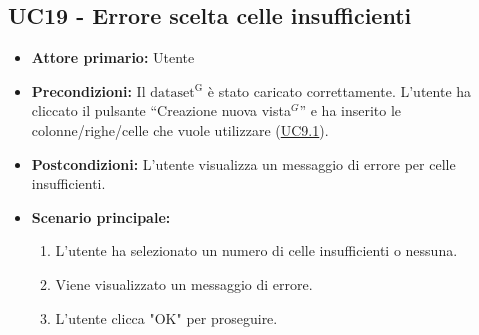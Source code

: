 \subsection{UC19 - Errore scelta celle insufficienti}
\label{sec:UC19 - Errore-celle-insufficienti}
\begin{itemize}
    \item \textbf{Attore primario:} Utente
    \item \textbf{Precondizioni:} Il ${\mathrm{dataset^{G}}}$ è stato caricato correttamente. L'utente ha cliccato il pulsante ``Creazione nuova vista$^{G}$'' e ha inserito le colonne/righe/celle che vuole utilizzare (\hyperref[sec:UC9.1]{UC9.1}).
    \item \textbf{Postcondizioni:} L'utente visualizza un messaggio di errore per celle insufficienti. 
    \item \textbf{Scenario principale:}
          \begin{enumerate}
              \item L'utente ha selezionato un numero di celle insufficienti o nessuna.
              \item Viene visualizzato un messaggio di errore.
              \item L'utente clicca "OK" per proseguire.
          \end{enumerate} 
\end{itemize}

